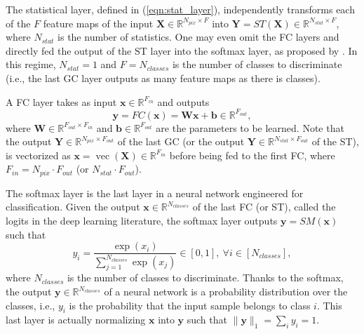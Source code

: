 \documentclass[final,twocolumn,3p,times,authoryear]{elsarticle}
\newcommand{\eqnref}[1]{(\ref{eqn:#1})}
\renewcommand{\b}[1]{{\bm{#1}}}   %
\newcommand{\1}{\b{1}}              %
\newcommand{\0}{\b{0}}              %
\newcommand{\W}{\b{W}}
\newcommand{\x}{\b{x}}
\newcommand{\X}{\b{X}}
\newcommand{\y}{\b{y}}
\newcommand{\Y}{\b{Y}}
\newcommand{\R}{\mathbb{R}}
\DeclareMathOperator*{\vect}{vec}
\begin{document}
The statistical layer, defined in \eqnref{stat_layer}, independently transforms each of the $F$ feature maps of the input $\X \in \R^{N_{pix} \times F}$ into $\Y = ST(\X) \in \R^{N_{stat} \times F}$, where $N_{stat}$ is the number of statistics. One may even omit the FC layers and directly fed the output of the ST layer into the softmax layer, as proposed by \citet{lin2013globalavgpooling}. In this regime, $N_{stat} = 1$ and $F = N_{classes}$ is the number of classes to discriminate (i.e., the last GC layer outputs as many feature maps as there is classes).

A FC layer takes as input $\x \in \R^{F_{in}}$ and outputs
\begin{equation*}
	\y = FC(\x) = \b W \x + \b b \in \R^{F_{out}} ,
\end{equation*}
where $\W \in \R^{F_{out} \times F_{in}}$ and $\b b \in \R^{F_{out}}$ are the parameters to be learned.
Note that the output $\Y \in \R^{N_{pix} \times F_{out}}$ of the last GC (or the output $\Y \in \R^{N_{stat} \times F_{out}}$ of the ST), is vectorized as $\x = \vect(\X) \in \R^{F_{in}}$ before being fed to the first FC, where $F_{in} = N_{pix} \cdot F_{out}$ (or $N_{stat} \cdot F_{out}$).

The softmax layer is the last layer in a neural network engineered for classification. Given the output $\x \in \R^{N_{classes}}$ of the last FC (or ST), called the logits in the deep learning literature, the softmax layer outputs $\y = SM(\x)$ such that
\begin{equation*}
	y_i = \frac{\exp(x_i)}{\sum_{j=1}^{N_{classes}} \exp(x_j)} \in [0, 1], \ \forall i \in [N_{classes}],
\end{equation*}
where $N_{classes}$ is the number of classes to discriminate. Thanks to the softmax, the output $\y \in \R^{N_{classes}}$ of a neural network is a probability distribution over the classes, i.e., $y_i$ is the probability that the input sample belongs to class $i$. This last layer is actually normalizing $\x$ into $\y$ such that $\| \y \|_1 = \sum_i y_i = 1$.
\end{document}
